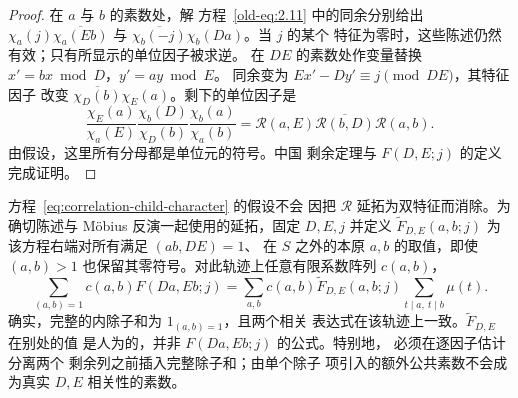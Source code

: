 \begin{proof}
在 $a$ 与 $b$ 的素数处，解
方程~\eqref{old-eq:2.11} 中的同余分别给出
$\chi_a(j)\overline{\chi_a(Eb)}$ 与
$\overline{\chi_b(-j)}\chi_b(Da)$。当 $j$ 的某个
特征为零时，这些陈述仍然有效；只有所显示的单位因子被求逆。
在 $DE$ 的素数处作变量替换 $x'=bx\bmod D$，$y'=ay\bmod E$。
同余变为 $Ex'-Dy'\equiv j\pmod{DE}$，其特征因子
改变 $\overline{\chi_D(b)}\chi_E(a)$。剩下的单位因子是
\[
 \frac{\chi_E(a)}{\chi_a(E)}
 \frac{\chi_b(D)}{\chi_D(b)}
 \frac{\chi_b(a)}{\chi_a(b)}
 =\mathcal R(a,E)\overline{\mathcal R(b,D)}\mathcal R(a,b).
\]
由假设，这里所有分母都是单位元的符号。中国
剩余定理与 $F(D,E;j)$ 的定义完成证明。
\end{proof}

方程~\eqref{eq:correlation-child-character} 的假设不会
因把 $\mathcal R$ 延拓为双特征而消除。为确切陈述与
M\"obius 反演一起使用的延拓，固定 $D,E,j$ 并定义
$\widetilde F_{D,E}(a,b;j)$ 为该方程右端对所有满足 $(ab,DE)=1$、
在 $S$ 之外的本原 $a,b$ 的取值，即使
$(a,b)>1$ 也保留其零符号。对此轨迹上任意有限系数阵列 $c(a,b)$，
\[
 \sum_{(a,b)=1}c(a,b)F(Da,Eb;j)
 =\sum_{a,b}c(a,b)\widetilde F_{D,E}(a,b;j)
                \sum_{t\mid a,\ t\mid b}\mu(t).
\]
确实，完整的内除子和为 $1_{(a,b)=1}$，且两个相关
表达式在该轨迹上一致。$\widetilde F_{D,E}$ 在别处的值
是人为的，并非 $F(Da,Eb;j)$ 的公式。特别地，
必须在逐因子估计分离两个
剩余列之前插入完整除子和；由单个除子
项引入的额外公共素数不会成为真实 $D,E$ 相关性的素数。
